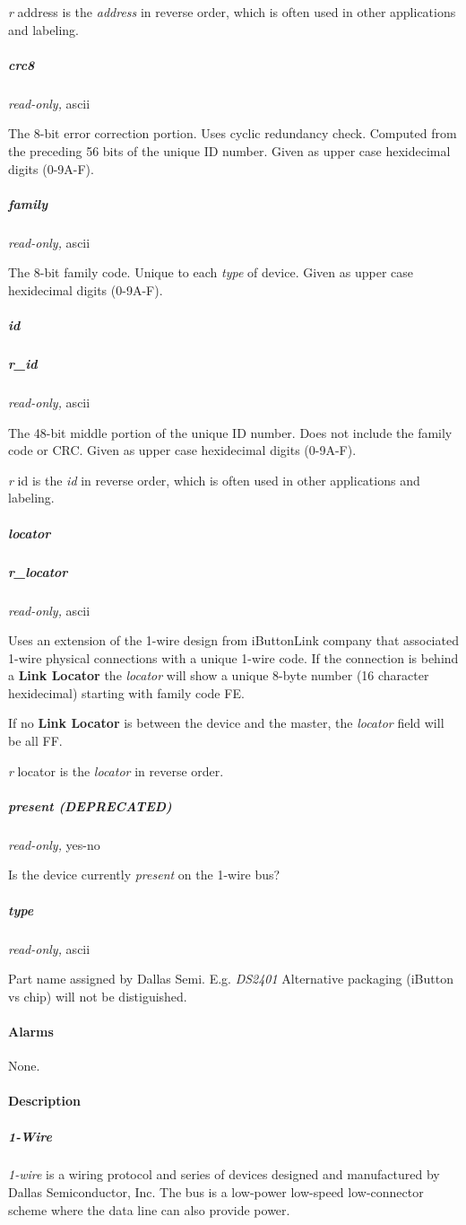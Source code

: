 \textit{r} address is the \textit{address} in reverse order, which is often used in other
applications and labeling. 
\subparagraph*{crc8}\textit{read-only,} ascii 

The 8-bit error correction portion. Uses cyclic redundancy check. Computed
from the preceding 56 bits of the unique ID number. Given as upper case
hexidecimal digits (0-9A-F). 
\subparagraph*{family}\textit{read-only,} ascii 

The 8-bit family code. Unique to each \textit{type} of device. Given as upper case
hexidecimal digits (0-9A-F). 
\subparagraph*{id}
\subparagraph*{r\_id}\textit{read-only,} ascii 

The 48-bit middle portion of the unique ID number. Does not include the family
code or CRC. Given as upper case hexidecimal digits (0-9A-F). 

\textit{r} id is the \textit{id} in reverse order, which is often used in other applications
and labeling. 
\subparagraph*{locator}
\subparagraph*{r\_locator}\textit{read-only,} ascii 

Uses an extension of the 1-wire design from iButtonLink company that associated
1-wire physical connections with a unique 1-wire code. If the connection is
behind a \textbf{Link Locator} the \textit{locator} will show a unique 8-byte number (16 character
hexidecimal) starting with family code FE. 

If no \textbf{Link Locator} is between the device and the master, the \textit{locator} field
will be all FF. 

\textit{r} locator is the \textit{locator} in reverse order. 
\subparagraph*{present (DEPRECATED)}\textit{read-only,}
yes-no 

Is the device currently \textit{present} on the 1-wire bus? 
\subparagraph*{type}\textit{read-only,} ascii 

Part name assigned by Dallas Semi. E.g. \textit{DS2401} Alternative packaging (iButton
vs chip) will not be distiguished.  
\paragraph*{Alarms}
None. 
\paragraph*{Description}
          
\subparagraph*{1-Wire}\textit{1-wire}
 is a wiring protocol and series of devices designed and manufactured by
Dallas Semiconductor, Inc. The bus is a low-power low-speed low-connector scheme
where the data line can also provide power. 

